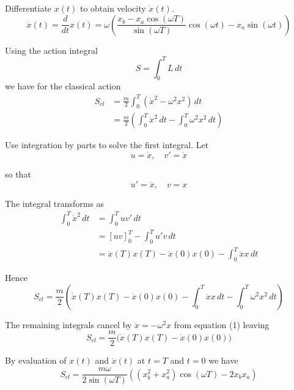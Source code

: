Differentiate $x(t)$ to obtain velocity $\dot x(t)$.
\begin{equation*}
\dot x(t)=\frac{d}{dt}x(t)=
\omega\left(
\frac{x_b-x_a\cos(\omega T)}{\sin(\omega T)}\cos(\omega t)-x_a\sin(\omega t)
\right)
\tag{3}
\end{equation*}

Using the action integral
\begin{equation*}
S=\int_0^T L\,dt
\end{equation*}
we have for the classical action
\begin{align*}
S_{cl}&=\frac{m}{2}\int_0^T (\dot{x}^2-\omega^2 x^2)\,dt
\\[1ex]
&=\frac{m}{2}\left(
\int_0^T\dot{x}^2\,dt
-\int_0^T\omega^2x^2\,dt\right)
\end{align*}

Use integration by parts to solve the first integral.
Let
\begin{equation*}
u=\dot x,\quad v'=\dot x
\end{equation*}

so that
\begin{equation*}
u'=\ddot x,\quad v=x
\end{equation*}

The integral transforms as
\begin{align*}
\int_0^T \dot x^2\,dt
&=\int_0^T uv'\,dt
\\
&=[uv]_0^T
-\int_0^Tu'v\,dt
\\
&=\dot x(T)x(T)-\dot x(0)x(0)-\int_0^T\ddot xx\,dt
\end{align*}

Hence
\begin{equation*}
S_{cl}=\frac{m}{2}\left(
\dot x(T)x(T)-\dot x(0)x(0)-\int_0^T \ddot xx\,dt
-\int_0^T\omega^2x^2\,dt
\right)
\end{equation*}

The remaining integrals cancel by $\ddot x=-\omega^2x$ from equation (1) leaving
\begin{equation*}
S_{cl}=\frac{m}{2}\bigl(\dot x(T)x(T)-\dot x(0)x(0)\bigr)
\tag{4}
\end{equation*}

By evaluation of $x(t)$ and $\dot x(t)$ at $t=T$ and $t=0$ we have
\begin{equation*}
S_{cl}=\frac{m\omega}{2\sin(\omega T)}
\left(\left(x_b^2+x_a^2\right)\cos(\omega T)-2x_b x_a\right)
\tag{5}
\end{equation*}



